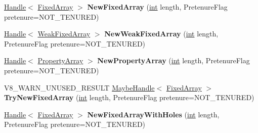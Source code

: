 \begin{DoxyCompactItemize}
\item 
\mbox{\label{classv8_1_1internal_1_1Factory_a67169408d7dc394e3966ec0654d82874}} 
\mbox{\hyperlink{classv8_1_1internal_1_1Handle}{Handle}}$<$ \mbox{\hyperlink{classv8_1_1internal_1_1FixedArray}{Fixed\+Array}} $>$ {\bfseries New\+Fixed\+Array} (\mbox{\hyperlink{classint}{int}} length, Pretenure\+Flag pretenure=N\+O\+T\+\_\+\+T\+E\+N\+U\+R\+ED)
\item 
\mbox{\label{classv8_1_1internal_1_1Factory_aeda989da34905ed036913b6c00911f93}} 
\mbox{\hyperlink{classv8_1_1internal_1_1Handle}{Handle}}$<$ \mbox{\hyperlink{classv8_1_1internal_1_1WeakFixedArray}{Weak\+Fixed\+Array}} $>$ {\bfseries New\+Weak\+Fixed\+Array} (\mbox{\hyperlink{classint}{int}} length, Pretenure\+Flag pretenure=N\+O\+T\+\_\+\+T\+E\+N\+U\+R\+ED)
\item 
\mbox{\label{classv8_1_1internal_1_1Factory_a19217f2c0f976e8a976f12bc245e5a8d}} 
\mbox{\hyperlink{classv8_1_1internal_1_1Handle}{Handle}}$<$ \mbox{\hyperlink{classv8_1_1internal_1_1PropertyArray}{Property\+Array}} $>$ {\bfseries New\+Property\+Array} (\mbox{\hyperlink{classint}{int}} length, Pretenure\+Flag pretenure=N\+O\+T\+\_\+\+T\+E\+N\+U\+R\+ED)
\item 
\mbox{\label{classv8_1_1internal_1_1Factory_a90614c259eb6716578c32bc585f5f86a}} 
V8\+\_\+\+W\+A\+R\+N\+\_\+\+U\+N\+U\+S\+E\+D\+\_\+\+R\+E\+S\+U\+LT \mbox{\hyperlink{classv8_1_1internal_1_1MaybeHandle}{Maybe\+Handle}}$<$ \mbox{\hyperlink{classv8_1_1internal_1_1FixedArray}{Fixed\+Array}} $>$ {\bfseries Try\+New\+Fixed\+Array} (\mbox{\hyperlink{classint}{int}} length, Pretenure\+Flag pretenure=N\+O\+T\+\_\+\+T\+E\+N\+U\+R\+ED)
\item 
\mbox{\label{classv8_1_1internal_1_1Factory_ac6343a81d0cb1d8828aae0cd454a4b98}} 
\mbox{\hyperlink{classv8_1_1internal_1_1Handle}{Handle}}$<$ \mbox{\hyperlink{classv8_1_1internal_1_1FixedArray}{Fixed\+Array}} $>$ {\bfseries New\+Fixed\+Array\+With\+Holes} (\mbox{\hyperlink{classint}{int}} length, Pretenure\+Flag pretenure=N\+O\+T\+\_\+\+T\+E\+N\+U\+R\+ED)
\item 
\mbox{\label{classv8_1_1internal_1_1Factory_aae5e0f6d87c144ef82d7f2215b2c5523}} 

\end{DoxyCompactItemize}
